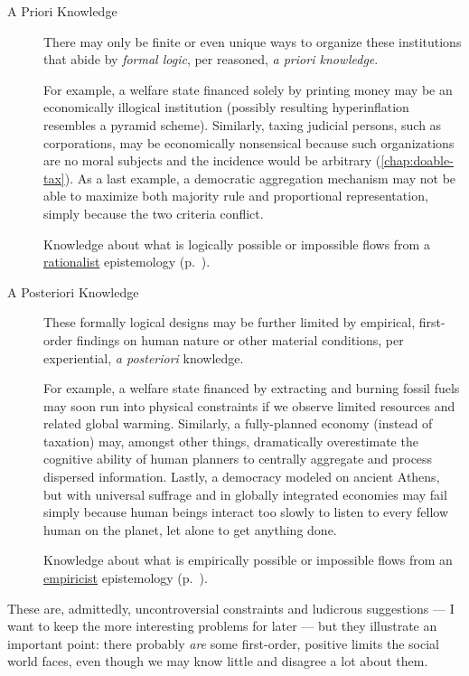 \begin{description}
	\item[A Priori Knowledge  \label{itm:a-priori}] 
	There may only be finite or even unique ways to organize these institutions that abide by \emph{formal logic}, per reasoned, \emph{a priori knowledge}. 
	
	For example, a welfare state financed solely by printing money may be an economically illogical institution (possibly resulting hyperinflation resembles a pyramid scheme). 
	Similarly, taxing judicial persons, such as corporations, may be economically nonsensical because such organizations are no moral subjects and the incidence would be arbitrary (\autoref{chap:doable-tax}). %
	As a last example, a democratic aggregation mechanism may not be able to maximize both majority rule and proportional representation, simply because the two criteria conflict. 
	
	Knowledge about what is logically possible or impossible flows from a \hyperref[itm:rationalism]{rationalist} epistemology (p.~\pageref{itm:rationalism}).
	
	\item[A Posteriori Knowledge  \label{itm:a-posteriori}] 
	These formally logical designs may be further limited by empirical, first-order findings on human nature or other material conditions, per experiential, \emph{a posteriori} knowledge. 
	
	For example, a welfare state financed by extracting and burning fossil fuels may soon run into physical constraints if we observe limited resources and related global warming. 
	Similarly, a fully-planned economy (instead of taxation) may, amongst other things, dramatically overestimate the cognitive ability of human planners to centrally aggregate and process dispersed information. 
	Lastly, a democracy modeled on ancient Athens, but with universal suffrage and in globally integrated economies may fail simply because human beings interact too slowly to listen to every fellow human on the planet, let alone to get anything done.
	
	Knowledge about what is empirically possible or impossible flows from an \hyperref[itm:empiricism]{empiricist} epistemology (p.~\pageref{itm:empiricism}). 
\end{description}

These are, admittedly, uncontroversial constraints and ludicrous suggestions --- I want to keep the more interesting problems for later --- but they illustrate an important point: there probably \emph{are} some first-order, positive limits the social world faces, even though we may know little and disagree a lot about them. 

